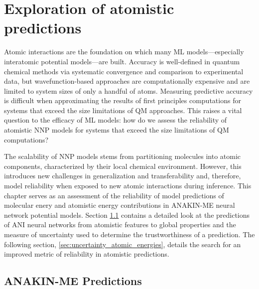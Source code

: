 \chapter{Exploration of atomistic predictions}
\label{chapter2}

Atomic interactions are the foundation on which many ML models---especially interatomic potential models---are built.
Accuracy is well-defined in quantum chemical methods via systematic convergence and comparison to experimental data, but wavefunction-based approaches are computationally expensive and are limited to system sizes of only a handful of atoms.
Measuring predictive accuracy is difficult when approximating the results of first principles computations for systems that exceed the size limitations of QM approaches.
This raises a vital question to the efficacy of ML models: how do we assess the reliability of atomistic NNP models for systems that exceed the size limitations of QM computations?

The scalability of NNP models stems from partitioning molecules into atomic components, characterized by their local chemical environment.
However, this introduces new challenges in generalization and transferability and, therefore, model reliability when exposed to new atomic interactions during inference.
This chapter serves as an assessment of the reliability of model predictions of molecular enery and atomistic energy contributions in ANAKIN-ME neural network potential models.
Section \ref{sec:ANI_predictions} contains a detailed look at the predictions of ANI neural networks from atomistic features to global properties and the measure of uncertainty used to determine the trustworthiness of a prediction.
The following section, \ref{sec:uncertainty_atomic_energies}, details the search for an improved metric of reliability in atomistic predictions.

\section{ANAKIN-ME Predictions}
\label{sec:ANI_predictions}


